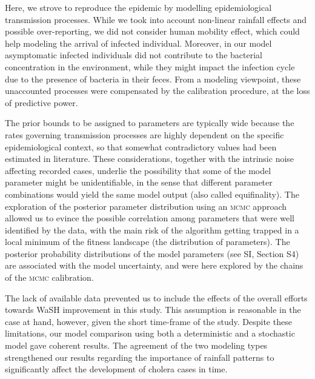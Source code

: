 Here, we strove to reproduce the epidemic by modelling epidemiological transmission processes. %
While we took into account non-linear rainfall effects and possible over-reporting, we did not consider human mobility effect\cite{Gatto:GeneralizedReproductionNumbers:2012,Bertuzzo:SpatiallyExplicitModels:2010,Mari:PredictiveAbilityMechanistic:2015,Perez-Saez:ClimatedrivenEndemicCholera:2017}, which could help modeling the arrival of infected individual.  Moreover, in our model asymptomatic infected individuals did not contribute to the bacterial concentration in the environment, while they might impact the infection cycle due to the presence of bacteria in their feces. From a modeling viewpoint, these unaccounted processes were compensated by the calibration procedure, at the loss of predictive power.

The prior bounds to be assigned to parameters are typically wide\cite{Akman:ExaminationModelsCholera:2016} because the rates governing transmission processes are highly dependent on the specific epidemiological context, so that somewhat contradictory values had been estimated in literature. These considerations, together with the intrinsic noise affecting recorded cases, underlie the possibility that some of the model parameter might be unidentifiable\cite{Eisenberg:IdentifiabilityEstimationMultiple:2013}, in the sense that different parameter combinations would yield the same model output (also called equifinality). 
The exploration of the posterior parameter distribution using an \textsc{mcmc} approach allowed us to evince the possible correlation among parameters that were well identified by the data, with the main risk of the algorithm getting trapped in a local minimum of the fitness landscape (the distribution of parameters). The posterior probability distributions of the model parameters (see SI, Section S4) are associated with the model uncertainty, and were here explored by the chains of the \textsc{mcmc} calibration.

The lack of available data prevented us to include the effects of the overall efforts towards WaSH improvement in this study. This assumption is reasonable in the case at hand, however, given the short time-frame of the study. %
Despite these limitations, our model comparison using both a deterministic and a stochastic model gave coherent results. The agreement of the two modeling types strengthened our results regarding the importance of rainfall patterns to significantly affect the development of cholera cases in time.

